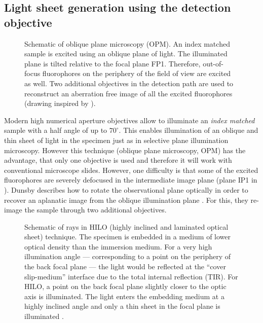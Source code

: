 \subsection{Light sheet generation using the detection objective}
\label{sec:hilo}
\begin{figure}[!hbt]
  \centering
  \caption{Schematic of oblique plane microscopy (OPM). An index
    matched sample is excited using an oblique plane of light. The
    illuminated plane is tilted relative to the focal plane
    FP1. Therefore, out-of-focus fluorophores on the periphery of the
    field of view are excited as well. Two additional objectives in
    the detection path are used to reconstruct an aberration free
    image of all the excited fluorophores (drawing inspired by
    \cite{Dunsby2008}).}
  \label{fig:dunsby}
\end{figure}
Modern high numerical aperture objectives allow to illuminate an
\emph{index matched} sample with a half angle of up to
$70^\circ$. This enables illumination of an oblique and thin sheet of
light in the specimen just as in selective plane illumination
microscopy. However this technique (oblique plane microscopy, OPM) has
the advantage, that only one objective is used and therefore it will
work with conventional microscope slides. However, one difficulty is
that some of the excited fluorophores are severely defocused in the
intermediate image plane (plane IP1 in ). Dunsby
describes how to rotate the observational plane optically in order to
recover an aplanatic image from the oblique illumination plane
\citep{Dunsby2008}. For this, they re-image the sample through two
additional objectives.


\begin{figure}[!hbt]
  \centering
  \caption{Schematic of rays in HILO (highly inclined and laminated
    optical sheet) technique. The specimen is embedded in a medium of
    lower optical density than the immersion medium. For a very high
    illumination angle --- corresponding to a point on the periphery
    of the back focal plane --- the light would be reflected at the
    ``cover slip-medium'' interface due to the total internal reflection
    (TIR). For HILO, a point on the back focal plane slightly closer
    to the optic axis is illuminated. The light enters the embedding
    medium at a highly inclined angle and only a thin sheet in the
    focal plane is illuminated \citep[inspired by][]{Tokunaga2008}.}
  \label{fig:hilo}
\end{figure}


